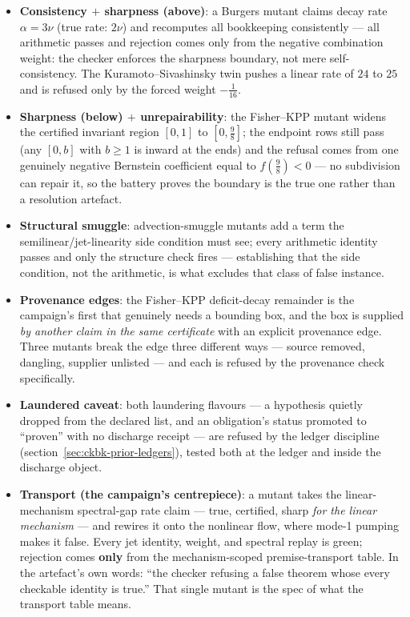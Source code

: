\begin{itemize}
\item \textbf{Consistency $+$ sharpness (above)}: a Burgers mutant
  claims decay rate $\alpha = 3\nu$ (true rate: $2\nu$) and recomputes
  all bookkeeping consistently --- all arithmetic passes and rejection
  comes only from the negative combination weight: the checker enforces
  the sharpness boundary, not mere self-consistency. The
  Kuramoto--Sivashinsky twin pushes a linear rate of $24$ to $25$ and
  is refused only by the forced weight $-\tfrac1{16}$.
\item \textbf{Sharpness (below) $+$ unrepairability}: the Fisher--KPP
  mutant widens the certified invariant region $[0,1]$ to
  $[0,\tfrac98]$; the endpoint rows still pass (any $[0,b]$ with
  $b \ge 1$ is inward at the ends) and the refusal comes from one
  genuinely negative Bernstein coefficient equal to $f(\tfrac98) < 0$
  --- no subdivision can repair it, so the battery proves the boundary
  is the true one rather than a resolution artefact.
\item \textbf{Structural smuggle}: advection-smuggle mutants add a term
  the semilinear/jet-linearity side condition must see; every
  arithmetic identity passes and only the structure check fires ---
  establishing that the side condition, not the arithmetic, is what
  excludes that class of false instance.
\item \textbf{Provenance edges}: the Fisher--KPP deficit-decay
  remainder is the campaign's first that genuinely needs a bounding
  box, and the box is supplied \emph{by another claim in the same
  certificate} with an explicit provenance edge. Three mutants break
  the edge three different ways --- source removed, dangling, supplier
  unlisted --- and each is refused by the provenance check
  specifically.
\item \textbf{Laundered caveat}: both laundering flavours --- a
  hypothesis quietly dropped from the declared list, and an
  obligation's status promoted to ``proven'' with no discharge receipt
  --- are refused by the ledger discipline
  (section~\ref{sec:ckbk-prior-ledgers}), tested both at the ledger and
  inside the discharge object.
\item \textbf{Transport (the campaign's centrepiece)}: a mutant takes
  the linear-mechanism spectral-gap rate claim --- true, certified,
  sharp \emph{for the linear mechanism} --- and rewires it onto the
  nonlinear flow, where mode-1 pumping makes it false. Every jet
  identity, weight, and spectral replay is green; rejection comes
  \textbf{only} from the mechanism-scoped premise-transport table. In
  the artefact's own words: ``the checker refusing a false theorem
  whose every checkable identity is true.'' That single mutant is the
  spec of what the transport table means.
\end{itemize}

